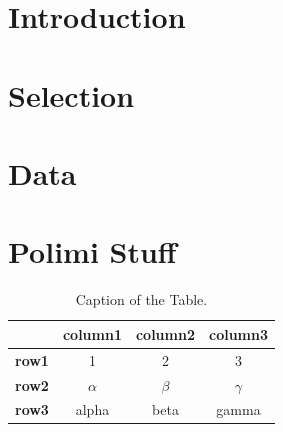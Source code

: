 \documentclass[11pt,a4paper]{article}
\begin{document}



\section*{Introduction}
\label{sec:introduction}




\section{Selection}
\label{sec:selection}



\section{Data}
\label{sec:data}


\section{Polimi Stuff}
\label{subsec:tables}

\begin{table}[H]
    \caption*{\textbf{Example of Table (optional)}}
    \centering 
    \begin{tabular}{|p{3em} c c c |}
    \hline
    \rowcolor{bluePoli!40}
     & \textbf{column1} & \textbf{column2} & \textbf{column3} \T\B \\
    \hline \hline
    \textbf{row1} & 1 & 2 & 3 \T\B \\
    \textbf{row2} & $\alpha$ & $\beta$ & $\gamma$ \T\B\\
    \textbf{row3} & alpha & beta & gamma \B\\
    \hline
    \end{tabular}
    \\[10pt]
    \caption{Caption of the Table.}
    \label{table:example}
\end{table}
\end{document}

